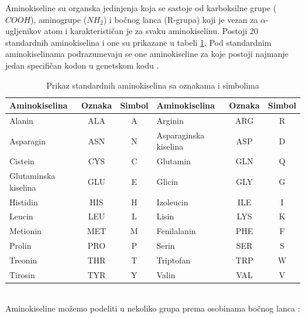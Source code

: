 Aminokiseline su organska jedinjenja koja se sastoje od karboksilne grupe ($COOH$), aminogrupe ($NH_2$) i bočnog lanca (R-grupa) koji je vezan za $\alpha$-ugljenikov atom i karakterističan je za svaku aminokiselinu. Postoji 20 standardnih aminokiselina i one su prikazane u tabeli \ref{tab: aminoacids}. Pod standardnim aminokiselinama podrazumevaju se one aminokiseline za koje postoji najmanje jedan specifičan kodon u genetskom kodu \cite{biochemestry5, biohUdz, straus}.


\begin{table}
	\centering
	\begin{tabular}{|lcc|lcc|}
		\hline
		Aminokiselina & Oznaka & Simbol & Aminokiselina & Oznaka & Simbol \\
		\hline
		Alanin & ALA & A & Arginin & ARG & R  \\
		Asparagin & ASN & N & Asparaginska kiselina & ASP & D \\
		Cistein & CYS & C & Glutamin & GLN & Q  \\
		Glutaminska kiselina & GLU & E & Glicin & GLY & G  \\
		Histidin & HIS & H & Izoleucin & ILE & I  \\
		Leucin & LEU & L & Lisin & LYS & K  \\
		Metionin & MET & M & Fenilalanin & PHE & F  \\
		Prolin & PRO & P & Serin & SER & S  \\
		Treonin & THR & T & Triptofan & TRP & W  \\
		Tirosin & TYR & Y & Valin & VAL & V \\
		\hline             
	\end{tabular}
	\caption{Prikaz standardnih aminokiselina sa oznakama i simbolima}
	\label{tab: aminoacids}
\end{table}

~ \\
\noindent Aminokiseline možemo podeliti u nekoliko grupa prema osobinama bočnog lanca \cite{biochemestry5, biohUdz, bioinf}:

